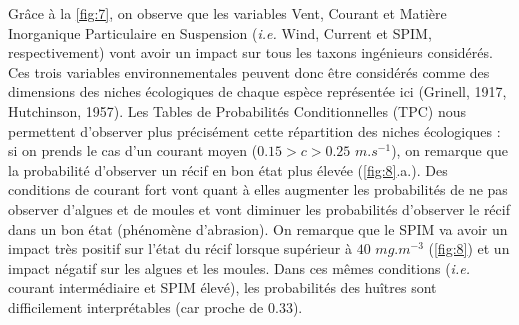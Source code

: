 \documentclass[12pt]{report}
\begin{document}
Grâce à la \autoref{fig:7}, on observe que les variables Vent, Courant et Matière Inorganique Particulaire en Suspension (\textit{i.e.} Wind, Current et SPIM, respectivement) vont avoir un impact sur tous les taxons ingénieurs considérés. Ces trois variables environnementales peuvent donc être considérés comme des dimensions des niches écologiques de chaque espèce représentée ici (Grinell, 1917, Hutchinson, 1957).
\newline \newline
Les Tables de Probabilités Conditionnelles (TPC) nous permettent d'observer plus précisément cette répartition des niches écologiques : si on prends le cas d'un courant moyen ($ 0.15> c >0.25$ $m.s^{-1}$), on remarque que la probabilité d'observer un récif en bon état plus élevée (\autoref{fig:8}.a.). Des conditions de courant fort vont quant à elles augmenter les probabilités de ne pas observer d'algues et de moules et vont diminuer les probabilités d'observer le récif dans un bon état (phénomène d'abrasion). On remarque que le SPIM va avoir un impact très positif sur l'état du récif lorsque supérieur à $40$ $mg.m^{-3}$ (\autoref{fig:8}) et un impact négatif sur les algues et les moules. Dans ces mêmes conditions (\textit{i.e.} courant intermédiaire et SPIM élevé), les probabilités des huîtres sont difficilement interprétables (car proche de 0.33).
\end{document}
